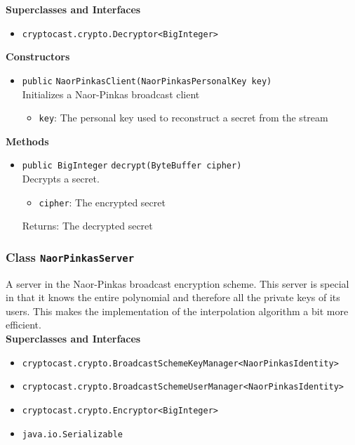 \textbf{Superclasses and Interfaces}
\begin{itemize}
\item \lstinline|cryptocast.crypto.Decryptor<BigInteger>|
\end{itemize}



\textbf{Constructors}
\begin{itemize}
\item \lstinline|public| \lstinline|NaorPinkasClient|\lstinline|(NaorPinkasPersonalKey key)|\\
Initializes a Naor-Pinkas broadcast client
\begin{itemize}
\item \lstinline|key|: The personal key used to reconstruct a secret from the stream
\end{itemize}



\end{itemize}


\textbf{Methods}
\begin{itemize}
\item \lstinline|public BigInteger| \lstinline|decrypt|\lstinline|(ByteBuffer cipher)|\\
Decrypts a secret.
\begin{itemize}
\item \lstinline|cipher|: The encrypted secret
\end{itemize}

Returns: The decrypted secret

\end{itemize}

\subsubsection{Class \lstinline|NaorPinkasServer|}
A server in the Naor-Pinkas broadcast encryption scheme. This server is special in that it knows
 the entire polynomial and therefore all the private keys of its users. This makes the implementation
 of the interpolation algorithm a bit more efficient. \\


\textbf{Superclasses and Interfaces}
\begin{itemize}
\item \lstinline|cryptocast.crypto.BroadcastSchemeKeyManager<NaorPinkasIdentity>|
\item \lstinline|cryptocast.crypto.BroadcastSchemeUserManager<NaorPinkasIdentity>|
\item \lstinline|cryptocast.crypto.Encryptor<BigInteger>|
\item \lstinline|java.io.Serializable|
\end{itemize}



